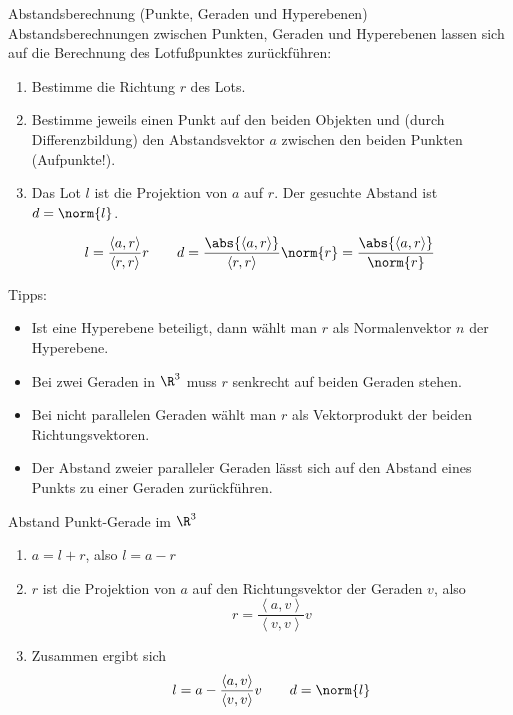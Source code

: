 \documentclass[german]{../spicker}
\newcommand{\scalarprod}[1]{\left\langle #1 \right\rangle}
\begin{document}
\begin{algo}{Abstandsberechnung (Punkte, Geraden und Hyperebenen)}
    Abstandsberechnungen zwischen Punkten, Geraden und Hyperebenen lassen sich auf die Berechnung des Lotfußpunktes zurückführen:

    \begin{enumerate}
        \item Bestimme die Richtung $r$ des Lots.
        \item Bestimme jeweils einen Punkt auf den beiden Objekten und (durch Differenzbildung) den Abstandsvektor $a$ zwischen den beiden Punkten (Aufpunkte!).
        \item Das Lot $l$ ist die Projektion von $a$ auf $r$. Der gesuchte Abstand ist $d = \norm{l}$.
    \end{enumerate}
    $$
        l = \frac{\scalarprod{a, r}}{\scalarprod{r, r}} r \qquad d = \frac{\abs{\scalarprod{a, r}}}{\scalarprod{r, r}} \norm{r} = \frac{\abs{\scalarprod{a, r}}}{\norm{r}}
    $$

    Tipps:
    \begin{itemize}
        \item Ist eine Hyperebene beteiligt, dann wählt man $r$ als Normalenvektor $n$ der Hyperebene.
        \item Bei zwei Geraden in $\R^3$ muss $r$ senkrecht auf beiden Geraden stehen.
        \item Bei nicht parallelen Geraden wählt man $r$ als Vektorprodukt der beiden Richtungsvektoren.
        \item Der Abstand zweier paralleler Geraden lässt sich auf den Abstand eines Punkts zu einer Geraden zurückführen.
    \end{itemize}
\end{algo}

\begin{algo}{Abstand Punkt-Gerade im $\R^3$}
    \begin{enumerate}
        \item $a = l + r$, also $l = a-r$
        \item $r$ ist die Projektion von $a$ auf den Richtungsvektor der Geraden $v$, also
              $$
                  r = \frac{\scalarprod{a, v}}{\scalarprod{v, v}}v
              $$
        \item Zusammen ergibt sich
              $$
                  l = a - \frac{\scalarprod{a, v}}{\scalarprod{v, v}}v \qquad d = \norm{l}
              $$
    \end{enumerate}
\end{algo}
\end{document}

